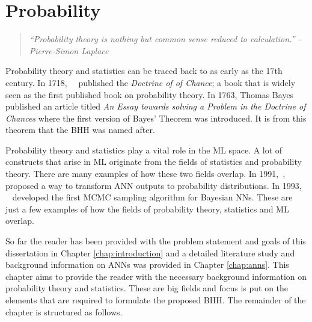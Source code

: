 \chapter{Probability}
\label{chap:probability}

\begin{quotation}
      \textit{``Probability theory is nothing but common sense reduced to calculation.'' - Pierre-Simon Laplace}
\end{quotation}

Probability theory and statistics can be traced back to as early as the 17th century. In 1718,~\citeauthor{ref:demoivre:1718}~\cite{ref:demoivre:1718} published the \textit{Doctrine of of Chance}; a book that is widely seen as the first published book on probability theory. In 1763, Thomas Bayes~\cite{ref:bayes:1763} published an article titled \textit{An Essay towards solving a Problem in the Doctrine of Chances} where the first version of Bayes' Theorem was introduced. It is from this theorem that the \ac{BHH} was named after.

Probability theory and statistics play a vital role in the \ac{ML} space. A lot of constructs that arise in \ac{ML} originate from the fields of statistics and probability theory. There are many examples of how these two fields overlap. In 1991,~\citeauthor{ref:denker:1991},~\cite{ref:denker:1991} proposed a way to transform \ac{ANN} outputs to probability distributions. In 1993,
\citeauthor{ref:neal:1993}~\cite{ref:neal:1993} developed the first \ac{MCMC} sampling algorithm for Bayesian \acp{NN}. These are just a  few examples of how the fields of probability theory, statistics and \ac{ML} overlap.

So far the reader has been provided with the problem statement and goals of this dissertation in Chapter \ref{chap:introduction} and a detailed literature study and background information on \acp{ANN} was provided in Chapter \ref{chap:anns}. This chapter aims to provide the reader with the necessary background information on probability theory and statistics. These are big fields and focus is put on the elements that are required to formulate the proposed \ac{BHH}. The remainder of the chapter is structured as follows.

